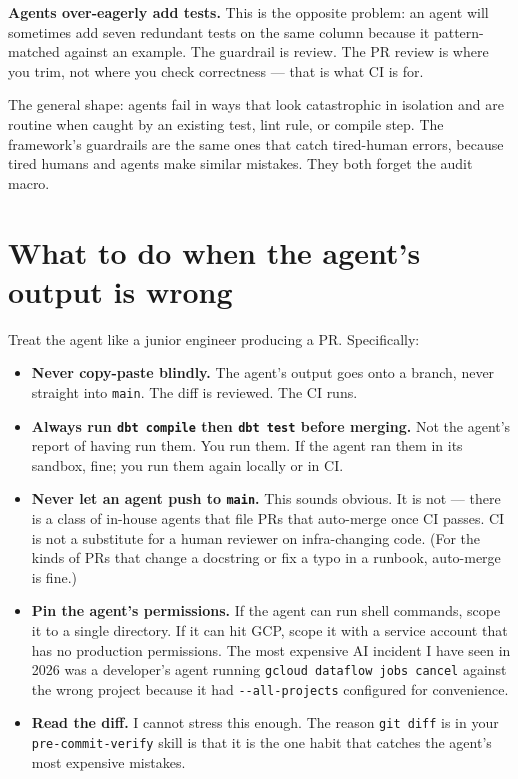 \documentclass[
  11pt,
  british,
  oneside]{book}
\providecommand{\tightlist}{%
  \setlength{\itemsep}{0pt}\setlength{\parskip}{0pt}}
\begin{document}
\textbf{Agents over-eagerly add tests.} This is the opposite problem: an
agent will sometimes add seven redundant tests on the same column
because it pattern-matched against an example. The guardrail is review.
The PR review is where you trim, not where you check correctness ---
that is what CI is for.

The general shape: agents fail in ways that look catastrophic in
isolation and are routine when caught by an existing test, lint rule, or
compile step. The framework's guardrails are the same ones that catch
tired-human errors, because tired humans and agents make similar
mistakes. They both forget the audit macro.

\hypertarget{what-to-do-when-the-agents-output-is-wrong}{%
\section{What to do when the agent's output is
wrong}\label{what-to-do-when-the-agents-output-is-wrong}}

Treat the agent like a junior engineer producing a PR. Specifically:

\begin{itemize}
\tightlist
\item
  \textbf{Never copy-paste blindly.} The agent's output goes onto a
  branch, never straight into \texttt{main}. The diff is reviewed. The
  CI runs.
\item
  \textbf{Always run \texttt{dbt\ compile} then \texttt{dbt\ test}
  before merging.} Not the agent's report of having run them. You run
  them. If the agent ran them in its sandbox, fine; you run them again
  locally or in CI.
\item
  \textbf{Never let an agent push to \texttt{main}.} This sounds
  obvious. It is not --- there is a class of in-house agents that file
  PRs that auto-merge once CI passes. CI is not a substitute for a human
  reviewer on infra-changing code. (For the kinds of PRs that change a
  docstring or fix a typo in a runbook, auto-merge is fine.)
\item
  \textbf{Pin the agent's permissions.} If the agent can run shell
  commands, scope it to a single directory. If it can hit GCP, scope it
  with a service account that has no production permissions. The most
  expensive AI incident I have seen in 2026 was a developer's agent
  running \texttt{gcloud\ dataflow\ jobs\ cancel} against the wrong
  project because it had \texttt{-\/-all-projects} configured for
  convenience.
\item
  \textbf{Read the diff.} I cannot stress this enough. The reason
  \texttt{git\ diff} is in your \texttt{pre-commit-verify} skill is that
  it is the one habit that catches the agent's most expensive mistakes.
\end{itemize}
\end{document}
